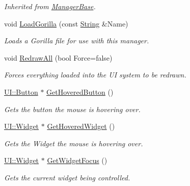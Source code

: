 \begin{DoxyCompactItemize}
\begin{DoxyCompactList}\small\item\em Inherited from \hyperlink{classphys_1_1ManagerBase}{ManagerBase}. \item\end{DoxyCompactList}\item 
void \hyperlink{classphys_1_1UIManager_afda4422105d6ab353fd40410adffbc0a}{LoadGorilla} (const \hyperlink{namespacephys_aa03900411993de7fbfec4789bc1d392e}{String} \&Name)
\begin{DoxyCompactList}\small\item\em Loads a Gorilla file for use with this manager. \item\end{DoxyCompactList}\item 
void \hyperlink{classphys_1_1UIManager_a4a4ce18dc4f32f8274a50fb4b99b87e3}{RedrawAll} (bool Force=false)
\begin{DoxyCompactList}\small\item\em Forces everything loaded into the UI system to be redrawn. \item\end{DoxyCompactList}\item 
\hyperlink{classphys_1_1UI_1_1Button}{UI::Button} $\ast$ \hyperlink{classphys_1_1UIManager_acd08dba5be95182a6c923ed698822277}{GetHoveredButton} ()
\begin{DoxyCompactList}\small\item\em Gets the button the mouse is hovering over. \item\end{DoxyCompactList}\item 
\hyperlink{classphys_1_1UI_1_1Widget}{UI::Widget} $\ast$ \hyperlink{classphys_1_1UIManager_a5772b611b6881eb98932f4b400b44d09}{GetHoveredWidget} ()
\begin{DoxyCompactList}\small\item\em Gets the Widget the mouse is hovering over. \item\end{DoxyCompactList}\item 
\hyperlink{classphys_1_1UI_1_1Widget}{UI::Widget} $\ast$ \hyperlink{classphys_1_1UIManager_a99694297814d2e82ec507c6f4d6bec1a}{GetWidgetFocus} ()
\begin{DoxyCompactList}\small\item\em Gets the current widget being controlled. \item\end{DoxyCompactList}\item 

\end{DoxyCompactItemize}
